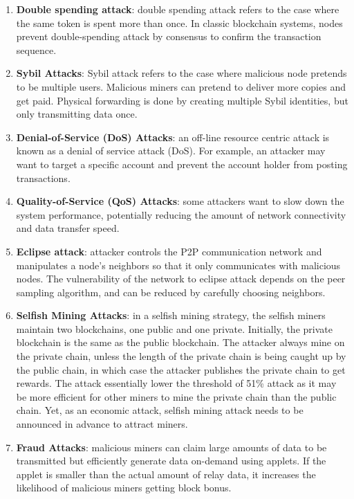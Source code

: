 \documentclass[reprint,pre,aps]{revtex4-1}
\begin{document}
\begin{enumerate}
\item \textbf{Double spending attack}: double spending attack refers to the case where the same token is spent more than once. In classic blockchain systems, nodes prevent double-spending attack by consensus to confirm the transaction sequence.
\item \textbf{Sybil Attacks}: Sybil attack refers to the case where malicious node pretends to be multiple users. Malicious miners can pretend to deliver more copies and get paid. Physical forwarding is done by creating multiple Sybil identities, but only transmitting data once.
\item \textbf{Denial-of-Service (DoS) Attacks}: an off-line resource centric attack is known as a denial of service attack (DoS). For example, an attacker may want to target a specific account and prevent the account holder from posting transactions.
\item \textbf{Quality-of-Service (QoS) Attacks}: some attackers want to slow down the system performance, potentially reducing the amount of network connectivity and data transfer speed.
\item \textbf{Eclipse attack}: attacker controls the P2P communication network and manipulates a node's neighbors so that it only communicates with malicious nodes. The vulnerability of the network to eclipse attack depends on the peer sampling algorithm, and can be reduced by carefully choosing neighbors.

\item \textbf{Selfish Mining Attacks}: in a selfish mining strategy, the selfish miners maintain two blockchains, one public and one private. Initially, the private blockchain is the same as the public blockchain. The attacker always mine on the private chain, unless the length of the private chain is being caught up by the public chain, in which case the attacker publishes the private chain to get rewards. The attack essentially lower the threshold of 51\% attack as it may be more efficient for other miners to mine the private chain than the public chain. Yet, as an economic attack, selfish mining attack needs to be announced in advance to attract miners.
\item \textbf{Fraud Attacks}: malicious miners can claim large amounts of data to be transmitted but efficiently generate data on-demand using applets. If the applet is smaller than the actual amount of relay data, it increases the likelihood of malicious miners getting block bonus.
\end{enumerate}
\end{document}
